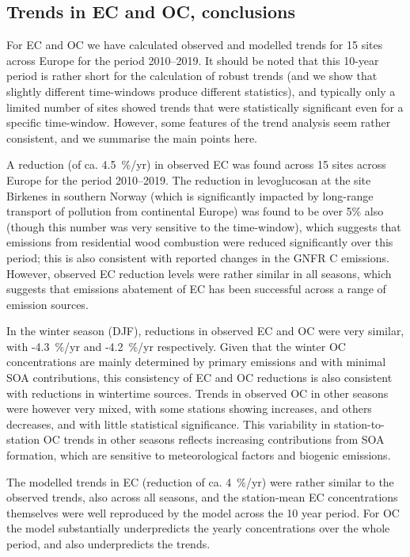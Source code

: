 \subsection{Trends in EC and OC, conclusions}
\label{ss:trendsECOCconc}

For EC and OC we have calculated observed and modelled trends for 15 sites across Europe for the period 2010--2019. It should be noted that this 10-year period is rather short for the calculation of robust trends (and we show that slightly different time-windows produce different statistics), and typically only a limited number of sites showed trends that were statistically significant even for a specific time-window. However, some features of the trend analysis seem rather consistent, and we summarise the main points here. 

A reduction (of ca. 4.5~\%/yr) in observed EC was found across 15 sites across Europe for the  period 
2010--2019. The reduction in levoglucosan at the site Birkenes in southern Norway (which is significantly impacted by long-range transport of pollution from continental Europe) was found to be over 5\% also (though this number was very sensitive to the time-window), which suggests that emissions from residential wood combustion were reduced significantly over this period; this is also consistent with reported changes in the GNFR C emissions. However, observed EC reduction levels were rather similar in all seasons, which suggests that emissions abatement of EC has been successful across a range of emission sources. 

In the winter season (DJF), reductions in observed EC and OC were very similar, with \mbox{-4.3~\%/yr} and -4.2~\%/yr respectively. Given that the winter OC concentrations are mainly determined by primary emissions and with minimal SOA contributions, this consistency of EC and OC reductions is also consistent with reductions in wintertime sources. Trends in observed OC in other seasons were however very mixed, with some stations showing increases, and others decreases, and with little statistical significance. This variability in station-to-station OC trends in other seasons reflects increasing contributions from SOA formation, which are sensitive to meteorological factors and biogenic emissions.

The modelled trends in EC (reduction of ca. 4~\%/yr) were rather similar to the observed trends, also across all seasons, and the station-mean EC concentrations themselves were well reproduced by the model across the 10 year period. 
For OC the model substantially underpredicts the yearly concentrations over the whole period, and also underpredicts the trends.  

